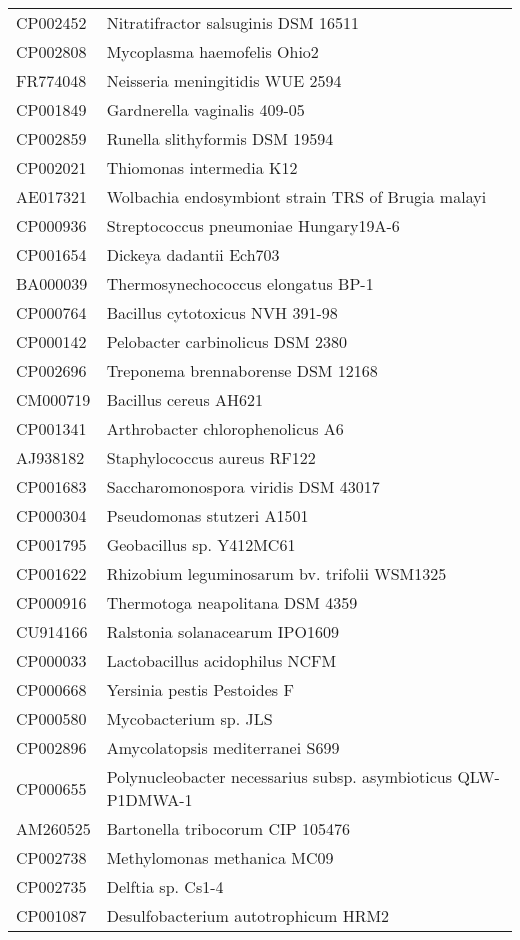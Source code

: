 \begin{longtable}{ll}
CP002452 & Nitratifractor salsuginis DSM 16511\\
CP002808 & Mycoplasma haemofelis Ohio2\\
FR774048 & Neisseria meningitidis WUE 2594\\
CP001849 & Gardnerella vaginalis 409-05\\
CP002859 & Runella slithyformis DSM 19594\\
CP002021 & Thiomonas intermedia K12\\
AE017321 & Wolbachia endosymbiont strain TRS of Brugia malayi\\
CP000936 & Streptococcus pneumoniae Hungary19A-6\\
CP001654 & Dickeya dadantii Ech703\\
BA000039 & Thermosynechococcus elongatus BP-1\\
CP000764 & Bacillus cytotoxicus NVH 391-98\\
CP000142 & Pelobacter carbinolicus DSM 2380\\
CP002696 & Treponema brennaborense DSM 12168\\
CM000719 & Bacillus cereus AH621\\
CP001341 & Arthrobacter chlorophenolicus A6\\
AJ938182 & Staphylococcus aureus RF122\\
CP001683 & Saccharomonospora viridis DSM 43017\\
CP000304 & Pseudomonas stutzeri A1501\\
CP001795 & Geobacillus sp. Y412MC61\\
CP001622 & Rhizobium leguminosarum bv. trifolii WSM1325\\
CP000916 & Thermotoga neapolitana DSM 4359\\
CU914166 & Ralstonia solanacearum IPO1609\\
CP000033 & Lactobacillus acidophilus NCFM\\
CP000668 & Yersinia pestis Pestoides F\\
CP000580 & Mycobacterium sp. JLS\\
CP002896 & Amycolatopsis mediterranei S699\\
CP000655 & Polynucleobacter necessarius subsp. asymbioticus QLW-P1DMWA-1\\
AM260525 & Bartonella tribocorum CIP 105476\\
CP002738 & Methylomonas methanica MC09\\
CP002735 & Delftia sp. Cs1-4\\
CP001087 & Desulfobacterium autotrophicum HRM2\\

\end{longtable}
